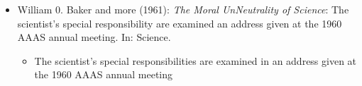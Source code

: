\begin{itemize}
	\item William 0. Baker and more (1961): \textit{The Moral UnNeutrality of Science}: The scientist's special responsibility are examined an address given at the 1960 AAAS annual meeting. In: Science.
		\begin{itemize}
			\item The scientist's special responsibilities are examined in an address given at the 1960 AAAS annual meeting
		\end{itemize}
\end{itemize}


\newpage